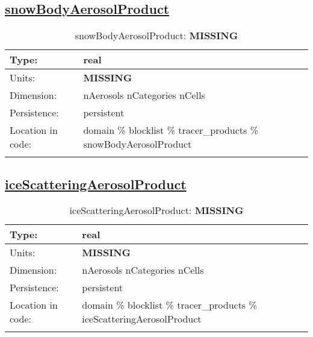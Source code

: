 \subsection[snowBodyAerosolProduct]{\hyperref[sec:var_tab_tracer_products]{snowBodyAerosolProduct}}
\label{subsec:var_sec_tracer_products_snowBodyAerosolProduct}
\begin{center}
\begin{longtable}{| p{2.0in} | p{4.0in} |}
        \hline 
        Type: & real \\
        \hline 
        Units: & {\bf \color{red} MISSING} \\
        \hline 
        Dimension: & nAerosols nCategories nCells \\
        \hline 
        Persistence: & persistent \\
        \hline 
         Location in code: & domain \% blocklist \% tracer\_products \% snowBodyAerosolProduct \\
         \hline 
    \caption{snowBodyAerosolProduct: {\bf \color{red} MISSING}}
\end{longtable}
\end{center}
\subsection[iceScatteringAerosolProduct]{\hyperref[sec:var_tab_tracer_products]{iceScatteringAerosolProduct}}
\label{subsec:var_sec_tracer_products_iceScatteringAerosolProduct}
\begin{center}
\begin{longtable}{| p{2.0in} | p{4.0in} |}
        \hline 
        Type: & real \\
        \hline 
        Units: & {\bf \color{red} MISSING} \\
        \hline 
        Dimension: & nAerosols nCategories nCells \\
        \hline 
        Persistence: & persistent \\
        \hline 
         Location in code: & domain \% blocklist \% tracer\_products \% iceScatteringAerosolProduct \\
         \hline 
    \caption{iceScatteringAerosolProduct: {\bf \color{red} MISSING}}
\end{longtable}
\end{center}
